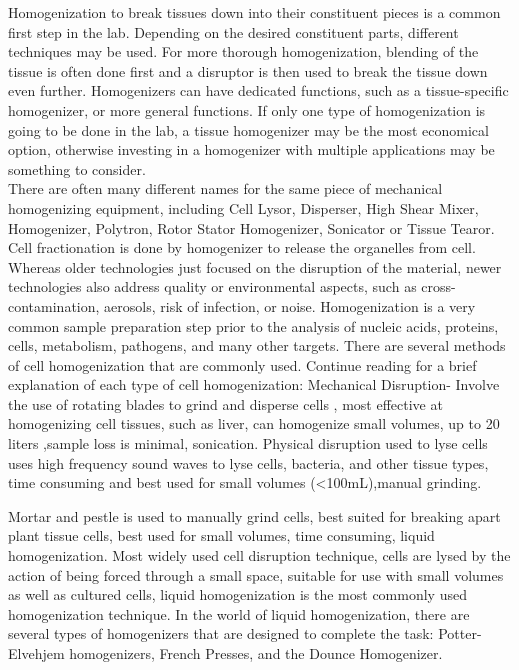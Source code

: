 \documentclass[a4paper,12pt]{article}
\begin{document}
  Homogenization to break tissues down into their constituent pieces is a common first step in the lab. Depending on the desired constituent parts, different techniques may be used. For more thorough homogenization, blending of the tissue is often done first and a disruptor is then used to break the tissue down even further. Homogenizers can have dedicated functions, such as a tissue-specific homogenizer, or more general functions. If only one type of homogenization is going to be done in the lab, a tissue homogenizer may be the most economical option, otherwise investing in a homogenizer with multiple applications may be something to consider.
  \\
  There are often many different names for the same piece of mechanical homogenizing equipment, including Cell Lysor, Disperser, High Shear Mixer, Homogenizer, Polytron, Rotor Stator Homogenizer, Sonicator or Tissue Tearor.
  \\
  
  Cell fractionation is done by homogenizer to release the organelles from cell. Whereas older technologies just focused on the disruption of the material, newer technologies also address quality or environmental aspects, such as cross-contamination, aerosols, risk of infection, or noise. Homogenization is a very common sample preparation step prior to the analysis of nucleic acids, proteins, cells, metabolism, pathogens, and many other targets.
  There are several methods of cell homogenization that are commonly used. Continue reading for a brief explanation of each type of cell homogenization:
  Mechanical Disruption-
  Involve the use of rotating blades to grind and disperse cells , most effective at homogenizing cell tissues, such as liver, can homogenize small volumes, up to 20 liters ,sample loss is minimal, sonication.
  Physical disruption used to lyse cells uses high frequency sound waves to lyse cells, bacteria, and other tissue types, time consuming and best used for small volumes (<100mL),manual grinding.
    
  Mortar and pestle is used to manually grind cells, best suited for breaking apart plant tissue cells, best used for small volumes, time consuming, liquid homogenization.
  Most widely used cell disruption technique, cells are lysed by the action of being forced through a small space, suitable for use with small volumes as well as cultured cells, liquid homogenization is the most commonly used homogenization technique. In the world of liquid homogenization, there are several types of homogenizers that are designed to complete the task: Potter-Elvehjem homogenizers, French Presses, and the Dounce Homogenizer.
  \\
  \\
  
\end{document}
